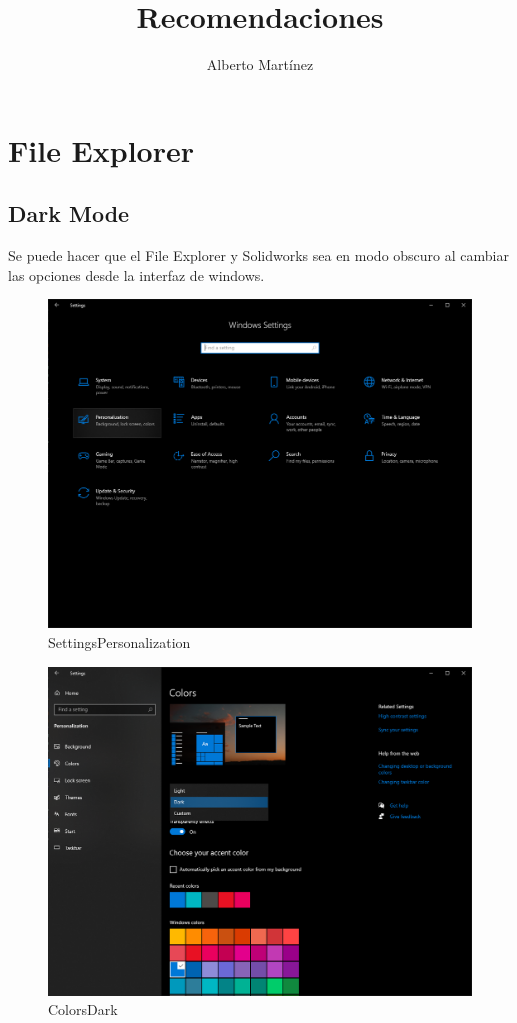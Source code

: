 \documentclass[12pt,letterpaper,final]{report}
\begin{document}
\title{Recomendaciones}
\author{Alberto Martínez}

\maketitle

\tableofcontents
	
\part{File Explorer}

\chapter{Dark Mode}

Se puede hacer que el File Explorer y Solidworks sea en modo obscuro al cambiar las opciones desde la interfaz de windows.

\begin{figure}[H]
	\centering
	\includegraphics[width=0.85\linewidth, height=0.5\textheight,keepaspectratio]{Imagenes/fe_dark_mode01}
	\caption{Settings\textrightarrow Personalization}
	\label{fig:fedarkmode01}
\end{figure}

\begin{figure}[H]
	\centering
	\includegraphics[width=0.85\linewidth, height=0.5\textheight,keepaspectratio]{Imagenes/fe_dark_mode02}
	\caption{Colors\textrightarrow Dark}
	\label{fig:fedarkmode02}
\end{figure}
\end{document}
